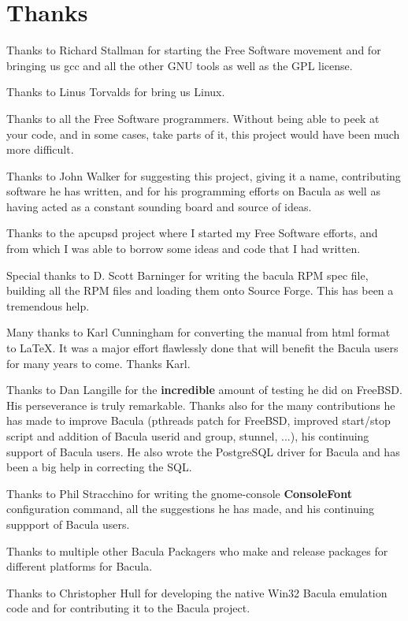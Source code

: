 
\section*{Thanks}
\label{_ChapterStart44}

Thanks to Richard Stallman for starting the Free Software movement and for
bringing us gcc and all the other GNU tools as well as the GPL license. 

Thanks to Linus Torvalds for bring us Linux. 

Thanks to all the Free Software programmers. Without being able to peek at
your code, and in some cases, take parts of it, this project would have been
much more difficult. 

Thanks to John Walker for suggesting this project, giving it a name,
contributing software he has written, and for his programming efforts on
Bacula as well as having acted as a constant sounding board and source of
ideas. 

Thanks to the apcupsd project where I started my Free Software efforts, and
from which I was able to borrow some ideas and code that I had written. 

Special thanks to D. Scott Barninger for writing the bacula RPM spec file,
building all the RPM files and loading them onto Source Forge. This has been a
tremendous help.

Many thanks to Karl Cunningham for converting the manual from html format to
LaTeX. It was a major effort flawlessly done that will benefit the Bacula
users for many years to come. Thanks Karl.

Thanks to Dan Langille for the {\bf incredible} amount of testing he did on
FreeBSD. His perseverance is truly remarkable. Thanks also for the many
contributions he has made to improve Bacula (pthreads patch for FreeBSD,
improved start/stop script and addition of Bacula userid and group, stunnel,
...), his continuing support of Bacula users. He also wrote the PostgreSQL
driver for Bacula and has been a big help in correcting the SQL. 

Thanks to Phil Stracchino for writing the gnome-console {\bf ConsoleFont}
configuration command, all the suggestions he has made, and his continuing
suppport of Bacula users. 

Thanks to multiple other Bacula Packagers who make and release packages for
different platforms for Bacula. 

Thanks to Christopher Hull for developing the native Win32 Bacula emulation
code and for contributing it to the Bacula project. 

